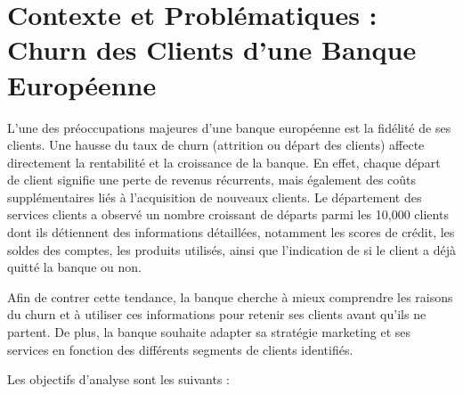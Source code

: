 \documentclass{article}
\begin{document}


















\section{Contexte et Problématiques : Churn des Clients d'une Banque Européenne}

L’une des préoccupations majeures d’une banque européenne est la fidélité de ses clients. Une hausse du taux de churn (attrition ou départ des clients) affecte directement la rentabilité et la croissance de la banque. En effet, chaque départ de client signifie une perte de revenus récurrents, mais également des coûts supplémentaires liés à l’acquisition de nouveaux clients. Le département des services clients a observé un nombre croissant de départs parmi les 10,000 clients dont ils détiennent des informations détaillées, notamment les scores de crédit, les soldes des comptes, les produits utilisés, ainsi que l'indication de si le client a déjà quitté la banque ou non.

Afin de contrer cette tendance, la banque cherche à mieux comprendre les raisons du churn et à utiliser ces informations pour retenir ses clients avant qu'ils ne partent. De plus, la banque souhaite adapter sa stratégie marketing et ses services en fonction des différents segments de clients identifiés.

Les objectifs d’analyse sont les suivants :
\end{document}

